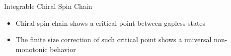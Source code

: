 \begin{frame}[allowframebreaks]
\begin{center}
        \vspace{0.5cm}
    
        \begin{minipage}{0.8\textwidth}
        \begin{block}{Integrable Chiral Spin Chain}
            \begin{itemize}
                \item Chiral spin chain shows a critical point between gapless states
                \item The finite size correction of such critical point shows a universal non-monotonic behavior
            \end{itemize}
        \end{block}
        \end{minipage}
    \end{center}
\end{frame}


                
                

                
                
                
